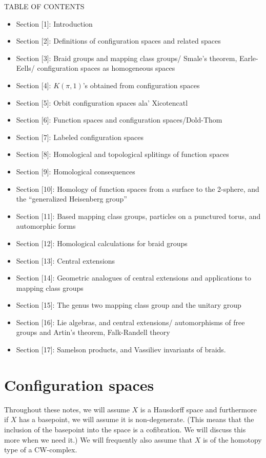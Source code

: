 \documentclass{amsart}
\begin{document}
 TABLE OF CONTENTS
\begin{itemize}

\item Section   [1]:  Introduction
\item Section   [2]:  Definitions of configuration spaces and related
spaces
\item Section   [3]:  Braid groups and mapping class groups/ Smale's
theorem, Earle-Eells/ configuration spaces as homogeneous spaces
\item Section   [4]:  $K(\pi,1)$'s obtained from configuration spaces
\item Section   [5]:  Orbit configuration spaces ala'  Xicotencatl
\item Section   [6]:  Function spaces and configuration spaces/Dold-Thom
\item Section   [7]:  Labeled configuration spaces
\item Section   [8]:  Homological and topological splitings of function
spaces
\item Section   [9]:  Homological consequences
\item Section   [10]:  Homology of function spaces from a surface to the
2-sphere,
and the ``generalized Heisenberg group''
\item Section  [11]:  Based mapping class groups, particles on a punctured
torus, and automorphic forms
\item Section  [12]:  Homological calculations for braid groups
\item Section  [13]:  Central extensions
\item Section  [14]:  Geometric analogues of central extensions and
applications to
mapping class groups
\item Section  [15]:  The genus two mapping class group and the unitary
group
\item Section  [16]:  Lie algebras, and central extensions/
automorphisms of free groups and Artin's theorem, Falk-Randell theory
\item Section  [17]:  Samelson products, and Vassiliev invariants
of braids.
\end{itemize}

\section{Configuration spaces}
\label{sec: conf}


Throughout these notes, we will assume $X$ is a Hausdorff space
and furthermore if $X$ has a basepoint, we will assume it is
non-degenerate. (This means that the inclusion of the basepoint into
the space is a cofibration. We will discuss this more when we need it.) 
We will frequently also assume that $X$ is of the homotopy type of a
CW-complex.
\end{document}
